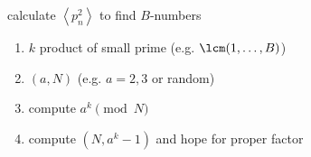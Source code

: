 \begin{example}
    calculate $\left< p_n^2 \right>$ to find $B$-numbers
\end{example}

\begin{example}
    \begin{enumerate}
        \item $k$ product of small prime (e.g. $\lcm(1, \dots, B)$)
        \item $(a, N)$ (e.g. $a = 2, 3$ or random)
        \item compute $a^k \pmod{N}$
        \item compute $(N, a^k - 1)$ and hope for proper factor
    \end{enumerate}
\end{example}


